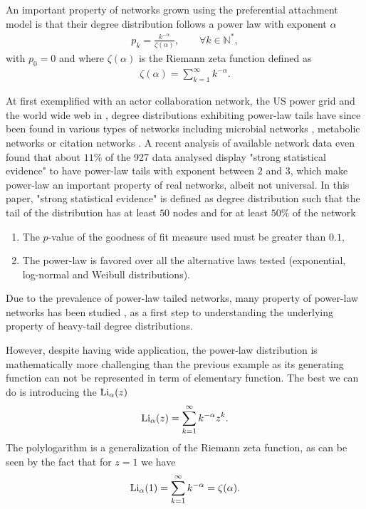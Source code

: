 \documentclass[
11pt, %
english, %
singlespacing, %
nolistspacing, %
liststotoc, %
headsepline, %
]{MastersDoctoralThesis} %
\begin{document}
An important property of networks grown using the preferential attachment model is that their degree distribution follows a power law with exponent $\alpha$
\begin{align}
	p_k = \frac{k^{-\alpha}}{\zeta(\alpha)}, \qquad \forall k \in \mathbb{N}^*, \label{Power law degree distribution}
\end{align}
with $p_0 = 0$ and where $\zeta(\alpha)$ is the Riemann zeta function defined as
\begin{align}
	\zeta(\alpha) = \sum_{k=1}^\infty k^{-\alpha}. \label{Definition Riemann zeta function}
\end{align}

At first exemplified with an actor collaboration network, the US power grid and the world wide web in \cite{barabasi1999emergence}, degree distributions exhibiting power-law tails have since been found in various types of networks including microbial networks \cite{agler2016microbial}, metabolic networks \cite{jeong2000large} or citation networks \cite{newman2001structure, jeong2003measuring}. A recent analysis of available network data \cite{broido2018scale} even found that about $11\%$ of the 927 data analysed display "strong statistical evidence" to have power-law tails with exponent between $2$ and $3$, which make power-law an important property of real networks, albeit not universal. In this paper, "strong statistical evidence" is defined as degree distribution such that the tail of the distribution has at least $50$ nodes and for at least $50\%$ of the network
\begin{enumerate}
	\item The $p$-value of the goodness of fit measure used must be greater than $0.1$,
	\item The power-law is favored over all the alternative laws tested (exponential, log-normal and Weibull distributions).
\end{enumerate}
Due to the prevalence of power-law tailed networks, many property of power-law networks has been studied \cite{aiello2000random, albert2000error, goh2001universal, ichinose2017invasion, pastorsatorras2015epidemic, stumpf2005subnets}, as a first step to understanding the underlying property of heavy-tail degree distributions.

However, despite having wide application, the power-law distribution is mathematically more challenging than the previous example as its generating function can not be represented in term of elementary function. The best we can do is introducing the  $\mathrm{Li}_{\alpha}\!\left(z\right)$
\begin{align}
	\mathrm{Li}_{\alpha}\!\left(z\right) = \sum_{k=1}^\infty k^{-\alpha} z^k. \label{Definition of polylogarithm}
\end{align}
The polylogarithm is a generalization of the Riemann zeta function, as can be seen by the fact that for $z = 1$ we have
\begin{align}
	\mathrm{Li}_{\alpha}\!\left(1\right) = \sum_{k=1}^\infty k^{-\alpha} = \zeta(\alpha) \label{Polylogarithm of 1}.
\end{align}
\end{document}
